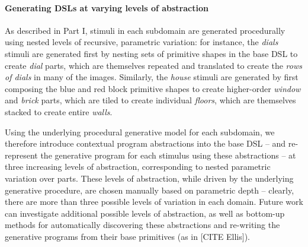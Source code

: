 \documentclass[10pt,letterpaper]{article}
\begin{document}
\paragraph{Generating DSLs at varying levels of abstraction} As described in Part I, stimuli in each subdomain are generated procedurally using nested levels of recursive, parametric variation: for instance, the \textit{dials} stimuli are generated first by nesting sets of primitive shapes in the base DSL to create \textit{dial} parts, which are themselves repeated and translated to create the \textit{rows of dials} in many of the images. Similarly, the \textit{house} stimuli are generated by first composing the blue and red block primitive shapes to create higher-order \textit{window} and \textit{brick} parts, which are tiled to create individual \textit{floors}, which are themselves stacked to create entire \textit{walls}. 


Using the underlying procedural generative model for each subdomain, we therefore introduce contextual program abstractions into the base DSL -- and re-represent the generative program for each stimulus using these abstractions -- at three increasing levels of abstraction, corresponding to nested parametric variation over parts. These levels of abstraction, while driven by the underlying generative procedure, are chosen manually based on parametric depth -- clearly, there are more than three possible levels of variation in each domain. Future work can investigate additional possible levels of abstraction, as well as bottom-up methods for automatically discovering these abstractions and re-writing the generative programs from their base primitives (as in [CITE Ellis]).
\end{document}
